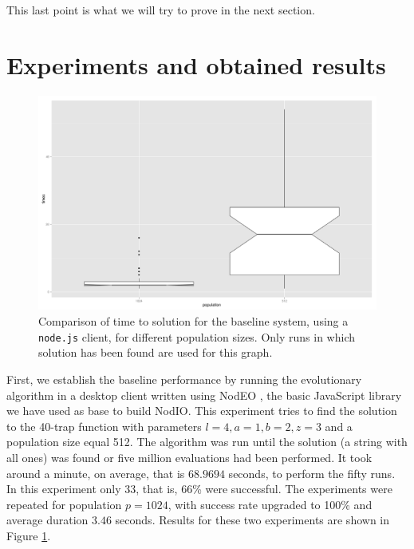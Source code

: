 \documentclass[journal,onecolumn]{IEEEtran}
\begin{document}
This last point is what we will try to prove in the next section.

\section{Experiments and obtained results}
\label{sec:experiments}

\begin{figure}[!t]
\centering
\includegraphics[width=12cm]{img/baseline-times.png}
\caption{Comparison of time to solution for the baseline system, using a {\tt
    node.js} client, for different population sizes. Only
runs in which solution has been found are used for this graph.}
\label{fig:baseline}
\end{figure}
First, we establish the baseline performance by running the
evolutionary algorithm in a desktop client written using NodEO \cite{nodeo2014}, the basic JavaScript library we have used as base to build {\sf NodIO}. This experiment tries to
find the solution to the 40-trap function with parameters $l=4, a=1,
b=2, z=3$ and a population size equal 512. The algorithm was run until the solution (a string with all
ones) was found or five million evaluations had been performed. It
took around a minute, on average, that is $68.9694$ seconds, to
perform the fifty runs. In this experiment only 33, that is, 66\% were
successful. The experiments were repeated for population $p=1024$,
with success rate upgraded to 100\% and average duration $3.46$
seconds. Results for these two experiments
are shown in Figure \ref{fig:baseline}. %
\end{document}

